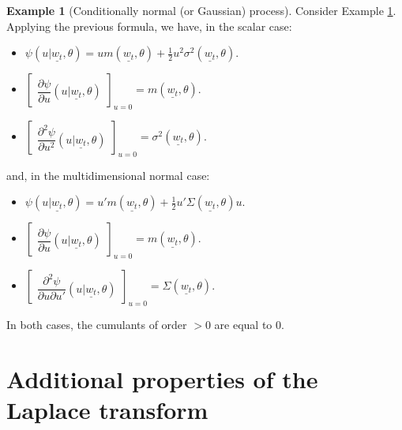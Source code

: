 \documentclass[
  12pt,
]{book}
\providecommand{\tightlist}{%
  \setlength{\itemsep}{0pt}\setlength{\parskip}{0pt}}
\theoremstyle{definition}
\theoremstyle{definition}
\newtheorem{example}{Example}[chapter]
\theoremstyle{definition}
\theoremstyle{definition}
\theoremstyle{remark}
\begin{document}
\begin{example}[Conditionally normal (or Gaussian) process]
\protect\hypertarget{exm:exGaussian}{}\label{exm:exGaussian}Consider Example \ref{exm:exGaussian}. Applying the previous formula, we have, in the scalar case:

\begin{itemize}
\tightlist
\item
  \(\psi(u|\underline{w_t},\theta)=u m(\underline{w_t},\theta) + \frac{1}{2}u^2\sigma^2(\underline{w_t},\theta)\).
\item
  \(\left[\begin{array}{l} \dfrac{\partial \psi}{\partial u} (u|\underline{w_t},\theta) \end{array} \right]_{u=0} = m(\underline{w_t},\theta)\).
\item
  \(\left[\begin{array}{l} \dfrac{\partial^2 \psi}{\partial u^2} (u|\underline{w_t},\theta) \end{array} \right]_{u=0} = \sigma^2(\underline{w_t},\theta)\).
\end{itemize}

and, in the multidimensional normal case:

\begin{itemize}
\tightlist
\item
  \(\psi(u|\underline{w_t},\theta)=u' m(\underline{w_t},\theta) + \frac{1}{2}u'\Sigma(\underline{w_t},\theta)u\).
\item
  \(\left[\begin{array}{l} \dfrac{\partial \psi}{\partial u} (u|\underline{w_t},\theta) \end{array} \right]_{u=0} = m(\underline{w_t},\theta)\).
\item
  \(\left[\begin{array}{l} \dfrac{\partial^2 \psi}{\partial u\partial u'} (u|\underline{w_t},\theta) \end{array} \right]_{u=0} = \Sigma(\underline{w_t},\theta)\).
\end{itemize}

In both cases, the cumulants of order \(>0\) are equal to \(0\).
\end{example}

\hypertarget{additional-properties-of-the-laplace-transform}{%
\section{Additional properties of the Laplace transform}\label{additional-properties-of-the-laplace-transform}}
\end{document}
